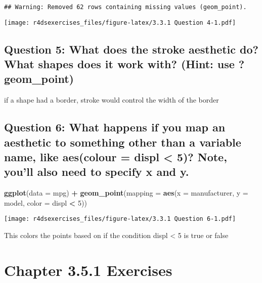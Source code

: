 \documentclass[
]{book}
\newenvironment{Shaded}{\begin{snugshade}}{\end{snugshade}}
\newcommand{\DataTypeTok}[1]{\textcolor[rgb]{0.13,0.29,0.53}{#1}}
\newcommand{\DecValTok}[1]{\textcolor[rgb]{0.00,0.00,0.81}{#1}}
\newcommand{\KeywordTok}[1]{\textcolor[rgb]{0.13,0.29,0.53}{\textbf{#1}}}
\newcommand{\NormalTok}[1]{#1}
\newcommand{\OperatorTok}[1]{\textcolor[rgb]{0.81,0.36,0.00}{\textbf{#1}}}
\newcommand{\StringTok}[1]{\textcolor[rgb]{0.31,0.60,0.02}{#1}}
\begin{document}
\begin{verbatim}
## Warning: Removed 62 rows containing missing values (geom_point).
\end{verbatim}

\texttt{[image: r4dsexercises\_files/figure-latex/3.3.1 Question 4-1.pdf]}

\hypertarget{question-5-what-does-the-stroke-aesthetic-do-what-shapes-does-it-work-with-hint-use-geom_point}{%
\subsection{Question 5: What does the stroke aesthetic do? What shapes does it work with? (Hint: use ?geom\_point)}\label{question-5-what-does-the-stroke-aesthetic-do-what-shapes-does-it-work-with-hint-use-geom_point}}

if a shape had a border, stroke would control the width of the border

\hypertarget{question-6-what-happens-if-you-map-an-aesthetic-to-something-other-than-a-variable-name-like-aescolour-displ-5-note-youll-also-need-to-specify-x-and-y.}{%
\subsection{Question 6: What happens if you map an aesthetic to something other than a variable name, like aes(colour = displ \textless{} 5)? Note, you'll also need to specify x and y.}\label{question-6-what-happens-if-you-map-an-aesthetic-to-something-other-than-a-variable-name-like-aescolour-displ-5-note-youll-also-need-to-specify-x-and-y.}}

\begin{Shaded}
\begin{Highlighting}[]
\KeywordTok{ggplot}\NormalTok{(}\DataTypeTok{data =}\NormalTok{ mpg) }\OperatorTok{+}
\StringTok{  }\KeywordTok{geom_point}\NormalTok{(}\DataTypeTok{mapping =} \KeywordTok{aes}\NormalTok{(}\DataTypeTok{x =}\NormalTok{ manufacturer, }\DataTypeTok{y =}\NormalTok{ model, }\DataTypeTok{color =}\NormalTok{ displ }\OperatorTok{<}\StringTok{ }\DecValTok{5}\NormalTok{))}
\end{Highlighting}
\end{Shaded}

\texttt{[image: r4dsexercises\_files/figure-latex/3.3.1 Question 6-1.pdf]}

This colors the points based on if the condition displ \textless{} 5 is true or false

\hypertarget{chapter-3.5.1-exercises}{%
\section{Chapter 3.5.1 Exercises}\label{chapter-3.5.1-exercises}}
\end{document}
